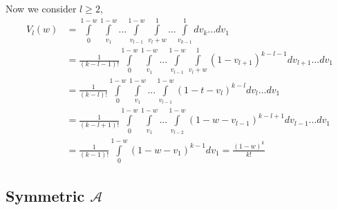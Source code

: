 \documentclass{llncs}
\begin{document}
Now we consider $l\ge 2$,
\begin{align}
V_{l}(w) & = \displaystyle \int\limits_0^{1-w}\int\limits_{{v_1}}^{1-w}...\int\limits_{v_{l-1}}^{1-w}\int\limits_{v_l+w}^1...\int\limits_{v_{k-1}}^1 dv_k... dv_1  \nonumber \\ 
& =  \displaystyle \frac{1}{(k-l-1)!}\displaystyle \int\limits_0^{1-w}\int\limits_{{v_1}}^{1-w}...\int\limits_{v_{l-1}}^{1-w}\int\limits_{v_l+w}^1 \left( 1-v_{l+1} \right)^{k-l-1} dv_{l+1}...dv_1   \nonumber \\
&=  \displaystyle \frac{1}{(k-l)!}\displaystyle \int\limits_0^{1-w}\int\limits_{{v_1}}^{1-w}...\int\limits_{v_{l-1}}^{1-w} \left( 1-t-v_{l} \right)^{k-l} dv_l...dv_1   \nonumber \\
& = \displaystyle \frac{1}{(k-l+1)!}\displaystyle \int\limits_0^{1-w}\int\limits_{{v_1}}^{1-w}...\int\limits_{v_{l-2}}^{1-w} \left( 1-w-v_{l-1} \right)^{k-l+1} dv_{l-1}...dv_1   \nonumber \\
& =  \displaystyle \frac{1}{(k-1)!} \int\limits_0^{1-w}\left( 1-w-v_1 \right)^{k-1} dv_1 = \frac{(1-w)^k}{k!} \label{eq:p_k}
\end{align}

\subsection{Symmetric $\mathcal{A}$}
\label{seq:symmetric_a} 

\end{document}
